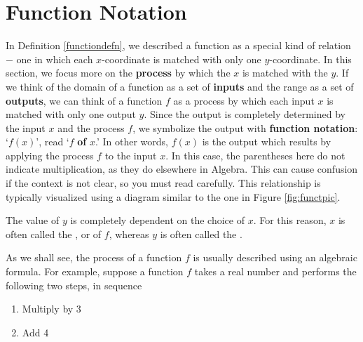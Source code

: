 \section{Function Notation}
\label{FunctionNotation}

In Definition \ref{functiondefn}, we described a function as a special kind of relation $-$ one in which each $x$-coordinate is matched with only one $y$-coordinate.  In this section, we focus more on the \textbf{process}  by which the $x$ is matched with the $y$.  If we think of the domain of a function as a set of \textbf{inputs} and the range as a set of \textbf{outputs}, we can think of a function $f$ as a process by which each input $x$ is matched with only one output $y$.  Since the output is completely determined by the input $x$ and the process $f$, we symbolize the output with  \textbf{function notation}: `$f(x)$', read `$f$ \textbf{of} $x$.' In other words, $f(x)$ is the output which results by applying the process $f$ to the input $x$.  In this case, the parentheses here do not indicate multiplication, as they do elsewhere in Algebra.  This can cause confusion if the context is not clear, so you must read carefully.   This relationship is typically visualized using a diagram similar to the one in Figure \ref{fig:functpic}.



The value of $y$ is completely dependent on the choice of $x$.  For this reason,  $x$ is often called the , or  of $f$, whereas $y$ is often called the . \label{functionargument}

\medskip

As we shall see, the process of a function $f$ is usually described using an algebraic formula. For example, suppose a function $f$ takes a real number and performs the following two steps, in sequence

\begin{enumerate}

\item  Multiply by 3

\item  Add 4

\end{enumerate}

